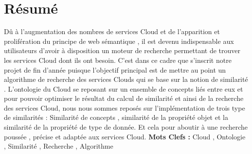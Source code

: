 \chapter*{Résumé}
Dû à l'augmentation des nombres de services Cloud et de l'apparition et prolifération du principe de web sémantique , il est devenu indispensable aux utilisateurs  d'avoir à disposition  un moteur de recherche permettant de trouver les services Cloud dont ils ont besoin.
C'est dans ce cadre que s'inscrit notre projet de fin d'année puisque l'objectif principal est de mettre au point un algorithme de recherche des services Clouds qui se base sur la notion de similarité .
L'ontologie du Cloud se reposant sur un ensemble de concepts liés entre eux et pour pouvoir optimiser le résultat du calcul de similarité et ainsi de la recherche des services Cloud, nous nous sommes reposés sur l'implémentation de trois type de similarités : Similarité de concepts , similarité de la propriété objet et la similarité de la propriété de type de donnée.
Et cela pour aboutir à une recherche poussée , précise et adaptée aux services Cloud.
\textbf{Mots Clefs : }Cloud , Ontologie , Similarité , Recherche , Algorithme\\ \ \\
